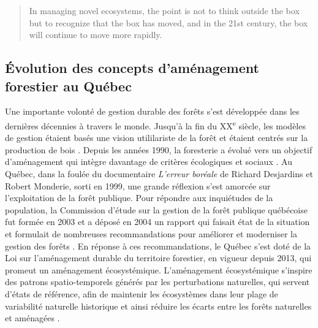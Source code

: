 \begin{quote}
In managing novel ecosystems, the point is not to think outside the box
but to recognize that the box has moved, and in the 21st century, the
box will continue to move more rapidly.
\end{quote}

\hypertarget{uxe9volution-des-concepts-damuxe9nagement-forestier-au-quuxe9bec}{%
\subsection{Évolution des concepts d'aménagement forestier au
Québec}\label{uxe9volution-des-concepts-damuxe9nagement-forestier-au-quuxe9bec}}

Une importante volonté de gestion durable des forêts s'est développée
dans les dernières décennies à travers le monde. Jusqu'à la fin du
XX\textsuperscript{e} siècle, les modèles de gestion étaient basés une
vision utililariste de la forêt et étaient centrés sur la production de
bois \citep{kuuluvainen_natural_2012}. Depuis les années 1990, la
foresterie a évolué vers un objectif d'aménagement qui intègre davantage
de critères écologiques et sociaux \citep{messier_managing_2013}. Au
Québec, dans la foulée du documentaire \emph{L'erreur boréale} de
Richard Desjardins et Robert Monderie, sorti en 1999, une grande
réflexion s'est amorcée sur l'exploitation de la forêt publique. Pour
répondre aux inquiétudes de la population, la Commission d'étude sur la
gestion de la forêt publique québécoise fut formée en 2003 et a déposé
en 2004 un rapport qui faisait état de la situation et formulait de
nombreuses recommandations pour améliorer et moderniser la gestion des
forêts
\citep{commission_detude_sur_la_gestion_de_la_foret_publique_quebecoise_commission_2004}.
En réponse à ces recommandations, le Québec s'est doté de la Loi sur
l'aménagement durable du territoire forestier, en vigueur depuis 2013,
qui promeut un aménagement écosystémique. L'aménagement écosystémique
s'inspire des patrons spatio-temporels générés par les perturbations
naturelles, qui servent d'états de référence, afin de maintenir les
écosystèmes dans leur plage de variabilité naturelle historique et ainsi
réduire les écarts entre les forêts naturelles et aménagées
\citep{attiwill_disturbance_1994, vaillancourt_implementation_2009}.

